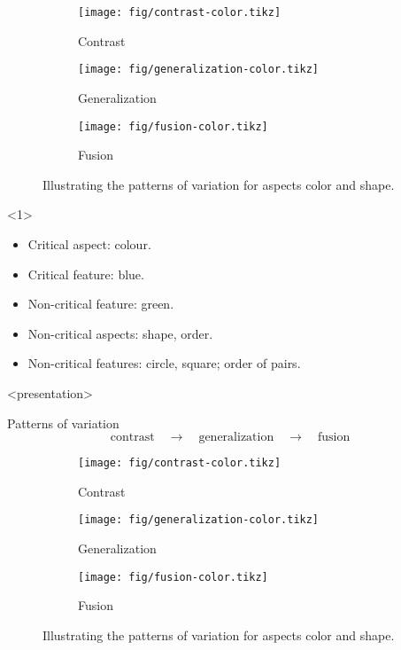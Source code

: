 \begin{frame}\label<1>{vtsummary}
  \begin{figure}
    \begin{subfigure}{0.3\columnwidth}
      \centering
      \texttt{[image: fig/contrast-color.tikz]}
      \caption{Contrast}
    \end{subfigure}
    \hfill
    \begin{subfigure}{0.3\columnwidth}
      \centering
      \texttt{[image: fig/generalization-color.tikz]}
      \caption{Generalization}
    \end{subfigure}
    \hfill
    \begin{subfigure}{0.3\columnwidth}
      \centering
      \texttt{[image: fig/fusion-color.tikz]}
      \caption{Fusion}
    \end{subfigure}
    \caption{%
      Illustrating the patterns of variation for aspects color and shape.
    }
  \end{figure}

  \begin{onlyenv}<1>
    \begin{example}
      \begin{itemize}
        \item Critical aspect: colour.
        \item Critical feature: blue.
        \item Non-critical feature: green.
        \item Non-critical aspects: shape, order.
        \item Non-critical features: circle, square; order of pairs.
      \end{itemize}
    \end{example}
  \end{onlyenv}
\end{frame}

\begin{frame}<presentation>
  \begin{block}{Patterns of variation}
    \vspace{-0.5em}
    \[
      \text{contrast}
      \quad\rightarrow\quad
      \text{generalization}
      \quad\rightarrow\quad
      \text{fusion}
    \]
  \end{block}

  \begin{figure}
    \begin{subfigure}{0.3\columnwidth}
      \centering
      \texttt{[image: fig/contrast-color.tikz]}
      \caption{Contrast}
    \end{subfigure}
    \hfill
    \begin{subfigure}{0.3\columnwidth}
      \centering
      \texttt{[image: fig/generalization-color.tikz]}
      \caption{Generalization}
    \end{subfigure}
    \hfill
    \begin{subfigure}{0.3\columnwidth}
      \centering
      \texttt{[image: fig/fusion-color.tikz]}
      \caption{Fusion}
    \end{subfigure}
    \caption{%
      Illustrating the patterns of variation for aspects color and shape.
    }
  \end{figure}
\end{frame}

